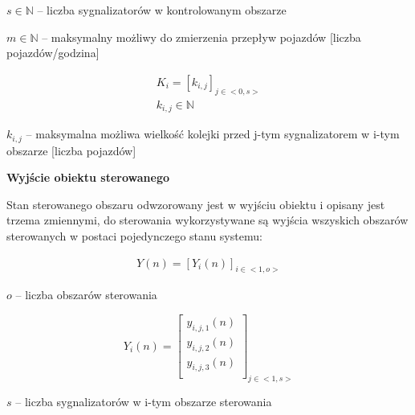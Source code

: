 \begin{math} s \in \mathbb{N} \end{math} \textrm{ -- liczba sygnalizatorów w kontrolowanym obszarze}

\begin{math} m \in \mathbb{N} \end{math} \textrm{ -- maksymalny możliwy do zmierzenia przepływ pojazdów [liczba pojazdów/godzina]}

\begin{equation}
	\begin{array}{c}
		K_{i} = \left[ k_{i, j} \right]_{j \in <0,s>}\\
		k_{i, j} \in \mathbb{N}
	\end{array}
\end{equation}

\begin{math} k_{i, j} \end{math} \textrm{ -- maksymalna możliwa wielkość kolejki przed j-tym sygnalizatorem w i-tym obszarze [liczba pojazdów]}

\vspace{1.5cm}
\textbf{Wyjście obiektu sterowanego}

Stan sterowanego obszaru odwzorowany jest w wyjściu obiektu i opisany jest trzema zmiennymi, do sterowania wykorzystywane są wyjścia wszyskich obszarów sterowanych w postaci pojedynczego stanu systemu:
\vspace{0.5cm}

\begin{equation}
	\begin{array}{c}
		Y (n) = \left[ Y_{i} (n) \right]_{i \in <1,o>}
	\end{array}
\end{equation}

\begin{math} o \end{math} \textrm{ -- liczba obszarów sterowania}

\begin{equation}
	Y_{i} (n) = \left[
	\begin{array}{c}
		y_{i, j, 1} (n)\\
		y_{i, j, 2} (n)\\
		y_{i, j, 3} (n)\\
	\end{array}
	\right]_{j \in <1,s>}
\end{equation}

\begin{math} s \end{math} \textrm{ -- liczba sygnalizatorów w i-tym obszarze sterowania}

